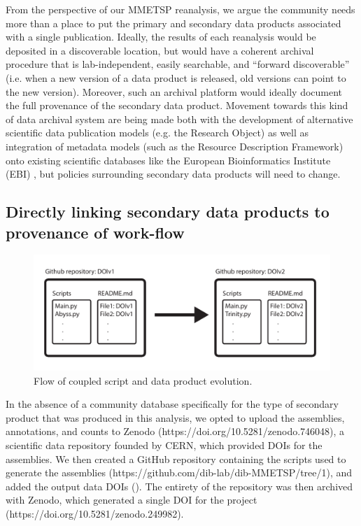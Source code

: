 \documentclass[12pt]{article}
\begin{document}
From the perspective of our MMETSP reanalysis, we argue the community needs more than a place to put the primary and secondary data products associated with a single publication. Ideally, the results of each reanalysis would be deposited in a discoverable location, but would have a coherent archival procedure that is lab-independent, easily searchable, and ``forward discoverable'' (i.e. when a  new version of a data product is released, old versions can point to the new version). Moreover, such an archival platform would ideally document the full provenance of the secondary data product. Movement towards this kind of data archival system are being made both with the development of alternative scientific data publication models (e.g. the Research Object\cite{Bechhofer2013}) as well as integration of metadata models (such as the Resource Description Framework) onto existing scientific databases like the European Bioinformatics Institute (EBI) \cite{Callahan2013}, but policies surrounding secondary data products will need to change.

\subsection{Directly linking secondary data products to provenance of work-flow}

\begin{figure}[h!]
  \centering
  \includegraphics[width=12cm]{Diagram.pdf}
  \caption{Flow of coupled script and data product evolution.}
  \label{FlowDiagram}
\end{figure}

In the absence of a community database specifically for the type of
secondary product that was produced in this analysis, we opted to
upload the assemblies, annotations, and counts to Zenodo
(https://doi.org/10.5281/zenodo.746048), a scientific data repository founded by CERN,
which provided DOIs for the assemblies.  We then created a GitHub
repository containing the scripts used to generate the assemblies (https://github.com/dib-lab/dib-MMETSP/tree/1), and
added the output data DOIs ().  The entirety of the
repository was then archived with Zenodo, which generated a single DOI
for the project (https://doi.org/10.5281/zenodo.249982).
\end{document}
